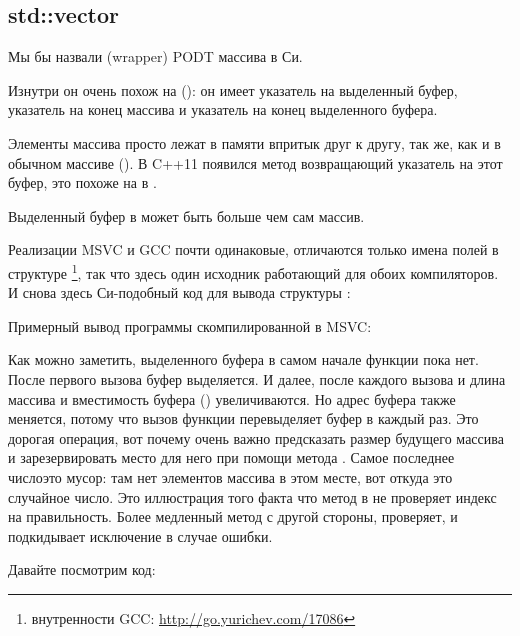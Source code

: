 \subsection{std::vector}

Мы бы назвали   (wrapper) \ac{PODT} массива в Си.

Изнутри он очень похож на  ():
он имеет указатель на выделенный буфер, указатель на конец массива и указатель на конец выделенного буфера.

Элементы массива просто лежат в памяти впритык друг к другу, так же, как и в обычном массиве ().
В C++11 появился метод  возвращающий указатель на этот буфер, это похоже на  в .

Выделенный буфер в  может быть больше чем сам массив.

Реализации MSVC и GCC почти одинаковые, отличаются только имена полей в структуре
\footnote
{внутренности GCC: \url{http://go.yurichev.com/17086}}, так что здесь один исходник работающий для обоих компиляторов.
И снова здесь Си-подобный код для вывода структуры :



Примерный вывод программы скомпилированной в MSVC:



Как можно заметить, выделенного буфера в самом начале функции \main пока нет.
После первого вызова  буфер выделяется.
И далее, после каждого вызова  
и длина массива и вместимость буфера () увеличиваются.
Но адрес буфера также меняется, потому что вызов функции  перевыделяет буфер в 
каждый раз.
Это дорогая операция, вот почему очень важно предсказать размер будущего массива и зарезервировать место для него
при помощи метода .
Самое последнее число\EMDASH{}это мусор: там нет элементов массива в этом месте, вот откуда это случайное число.
Это иллюстрация того факта что метод  в  не проверяет индекс на правильность.
Более медленный метод  с другой стороны, проверяет, и подкидывает исключение  
в случае ошибки.

Давайте посмотрим код:



